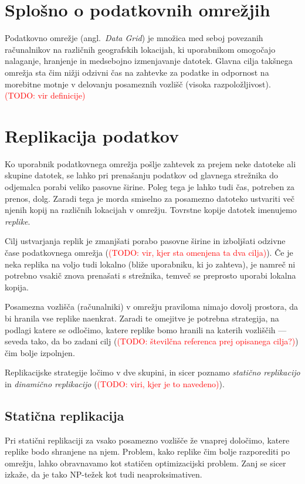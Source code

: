 \documentclass[a4paper, 12pt]{book}
\newcommand{\newterm}{\textit}
\newcommand{\TODO}[1]{\textcolor{red}{(TODO: #1)}}
\begin{document}
\section{Splošno o podatkovnih omrežjih}

Podatkovno omrežje (angl.~\textit{Data Grid}) je množica med seboj
povezanih ra\-ču\-nal\-ni\-kov na različnih geografskih lokacijah, ki
uporabnikom omogočajo nalaganje, hranjenje in medsebojno izmenjavanje datotek.
Glavna cilja takšnega omrežja sta čim nižji odzivni čas na zahtevke za
podatke in odpornost na morebitne motnje v delovanju posameznih vozlišč
(visoka razpoložljivost). \TODO{vir definicije}

\section{Replikacija podatkov}

Ko uporabnik podatkovnega omrežja pošlje zahtevek za prejem neke datoteke
ali skupine datotek, se lahko pri prenašanju podatkov od glavnega strežnika
do odjemalca porabi veliko pasovne širine. Poleg tega je lahko tudi čas,
potreben za prenos, dolg. Zaradi tega je morda smiselno za posamezno
datoteko ustvariti več njenih kopij na različnih lokacijah v omrežju.
Tovrstne kopije datotek imenujemo \newterm{replike}.

Cilj ustvarjanja replik je zmanjšati porabo pasovne širine in izboljšati
odzivne čase podatkovnega omrežja (\TODO{vir, kjer sta omenjena ta dva
cilja}). Če je neka replika na voljo tudi lokalno (bliže
uporabniku, ki jo zahteva), je namreč ni potrebno vsakič znova prenašati s
strežnika, temveč se preprosto uporabi lokalna kopija.

Posamezna vozlišča (računalniki) v omrežju praviloma nimajo dovolj prostora,
da bi hranila vse replike naenkrat. Zaradi te omejitve je potrebna
strategija, na podlagi katere se odločimo, katere replike bomo hranili
na katerih vozliščih --- seveda tako, da bo zadani cilj (\TODO{številčna
referenca prej opisanega cilja?}) čim bolje izpolnjen.

Replikacijske strategije ločimo v dve skupini, in sicer poznamo
\newterm{statično replikacijo} in \newterm{dinamično replikacijo}
(\TODO{viri, kjer je to navedeno}).

\subsection{Statična replikacija}

Pri statični replikaciji za vsako posamezno vozlišče že vnaprej določimo,
katere replike bodo shranjene na njem. Problem, kako replike čim bolje
razporediti po omrežju, lahko obravnavamo kot statičen optimizacijski
problem. Zanj se sicer izkaže, da je tako NP-težek kot tudi
neaproksimativen.
\end{document}
